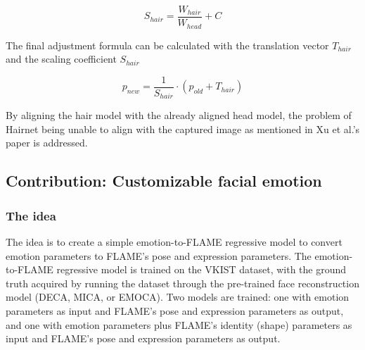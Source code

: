 \begin{equation}
    S_{hair} = \frac{W_{hair}}{W_{head}} + C
\end{equation}

The final adjustment formula can be calculated with the translation vector $T_{hair}$ and the scaling coefficient $S_{hair}$

\begin{equation}
    p_{new} = \frac{1}{S_{hair}}\cdot(p_{old} + T_{hair})
\end{equation}

By aligning the hair model with the already aligned head model, the problem of Hairnet being unable to align with the captured image as mentioned in Xu et al.'s paper \cite{xuDeep3DPortrait2020} is addressed.



\subsection{Contribution: Customizable facial emotion}


\subsubsection{The idea}

The idea is to create a simple emotion-to-FLAME regressive model to convert emotion parameters to FLAME's pose and expression parameters. The emotion-to-FLAME regressive model is trained on the VKIST dataset, with the ground truth acquired by running the dataset through the pre-trained face reconstruction model (DECA, MICA, or EMOCA). Two models are trained: one with emotion parameters as input and FLAME's pose and expression parameters as output, and one with emotion parameters plus FLAME's identity (shape) parameters as input and FLAME's pose and expression parameters as output.




